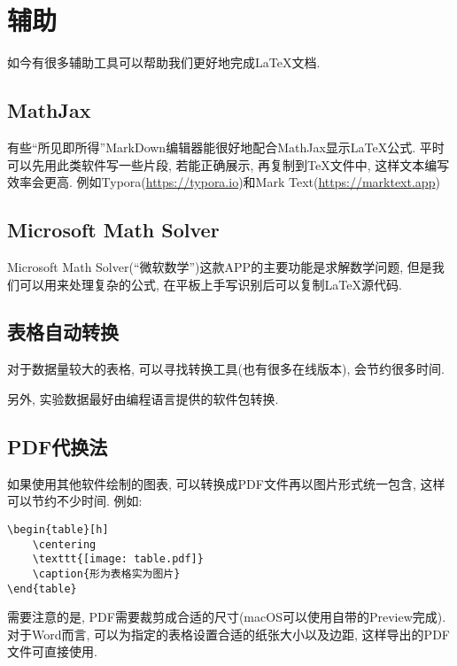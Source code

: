 \chapter{辅助}

如今有很多辅助工具可以帮助我们更好地完成\LaTeX{}文档.

\section{MathJax}

有些``所见即所得''MarkDown编辑器能很好地配合MathJax显示\LaTeX{}公式.
平时可以先用此类软件写一些片段, 若能正确展示, 再复制到\TeX{}文件中, 这样文本编写效率会更高.
例如Typora(\url{https://typora.io})和Mark Text(\url{https://marktext.app})

\section{Microsoft Math Solver}

Microsoft Math Solver(``微软数学'')这款APP的主要功能是求解数学问题, 但是我们可以用来处理复杂的公式, 在平板上手写识别后可以复制\LaTeX{}源代码.

\section{表格自动转换}

对于数据量较大的表格, 可以寻找转换工具(也有很多在线版本), 会节约很多时间.

另外, 实验数据最好由编程语言提供的软件包转换.

\section{PDF代换法}

如果使用其他软件绘制的图表, 可以转换成PDF文件再以图片形式统一包含, 这样可以节约不少时间.
例如:
\begin{Verbatim}
\begin{table}[h]
    \centering
    \texttt{[image: table.pdf]}
    \caption{形为表格实为图片}
\end{table}
\end{Verbatim}
需要注意的是, PDF需要裁剪成合适的尺寸(macOS可以使用自带的Preview完成).
对于Word而言, 可以为指定的表格设置合适的纸张大小以及边距, 这样导出的PDF文件可直接使用.
